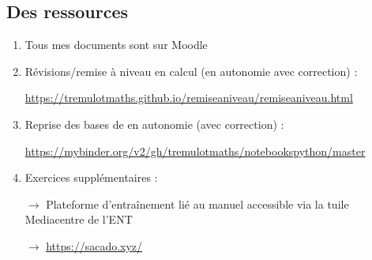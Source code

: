 \documentclass[12pt,oneside]{report}
\begin{document}
\begin{spacing}{1.2}
\section*{Des ressources}

\begin{enumerate}
\item Tous mes documents sont sur Moodle

\item Révisions/remise à niveau en calcul (en autonomie avec correction) : 

\url{https://tremulotmaths.github.io/remiseaniveau/remiseaniveau.html}

\item Reprise des bases de \python en autonomie (avec correction) :

\url{https://mybinder.org/v2/gh/tremulotmaths/notebookspython/master}

\item Exercices supplémentaires :

$\longrightarrow$ Plateforme d'entraînement lié au manuel accessible via la \og tuile \fg{} Mediacentre de l'ENT

$\longrightarrow$ \url{https://sacado.xyz/}

\end{enumerate}





\end{spacing}
\end{document}
